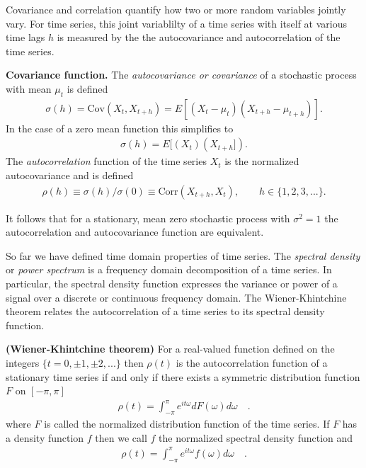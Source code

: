   Covariance and correlation quantify how two or more random 
  variables jointly vary. For time series, this   
  joint variablilty of a time series with itself at 
  various time lags $h$ is measured by the the 
  autocovariance and autocorrelation of the time series.
  \begin{defn}{\textbf{Covariance function.}} 
  \label{eq:auto_covariance}
  The  \textit{autocovariance or covariance} of a stochastic 
  process with mean $\mu_t$ 
  is defined
  \begin{align*}
    \sigma(h) = \text{Cov}(X_{t}, X_{t + h})
                = E[(X_{t}-\mu_t)(X_{t + h} - \mu_{t + h})].  
   \end{align*}
   In the case of a zero mean function this simplifies to
   \begin{align*}
      \sigma(h) = E[(X_{t})(X_{t + h}]).  
   \end{align*}
    The \textit{autocorrelation} function of the time series $X_t$ is
    the normalized autocovariance and is defined
    \begin{align*}
       \rho(h) \equiv \sigma(h)/\sigma(0) \equiv \text{Corr}(X_{t + h}, X_t), 
       \hspace{2em} h \in \{ 1,2,3,... \}.
     \end{align*} 
  \end{defn} 
  It follows that for a stationary, mean zero stochastic process with 
  $\sigma^2 = 1$ the autocorrelation and autocovariance function 
   are equivalent. 

  So far we have defined time domain properties of time series. The \textit{spectral density}
  or \textit{power spectrum} is a frequency domain 
  decomposition of a time series. In particular, 
  the spectral density function expresses the variance or power of a signal over a discrete or continuous frequency domain. The Wiener-Khintchine theorem relates the autocorrelation of a time series to its 
  spectral density function. 
  
\begin{thm}{\textbf{(Wiener-Khintchine theorem)}}
  For a real-valued function defined on the integers 
  $\{ t = 0, \pm 1, \pm 2, ... \}$ then $\rho(t)$ 
  is the autocorrelation function of a stationary 
  time series if and only if there exists a 
  symmetric distribution function $F$ on $[-\pi, \pi]$
  \begin{align}
      \rho( t ) =  \int_{-\pi}^{\pi} e^{i t \omega}dF(\omega)d \omega \hspace{1em}.
    \end{align}
    where $F$ is called the normalized distribution function
    of the time series. If $F$ has a density function $f$
    then we call $f$ the normalized spectral density function
    and 
    \begin{align}
      \rho(t) =  \int_{-\pi}^{\pi} e^{i t \omega}f(\omega)d \omega \hspace{1em}.
    \end{align}\cite{fan2003}
\end{thm}
   
